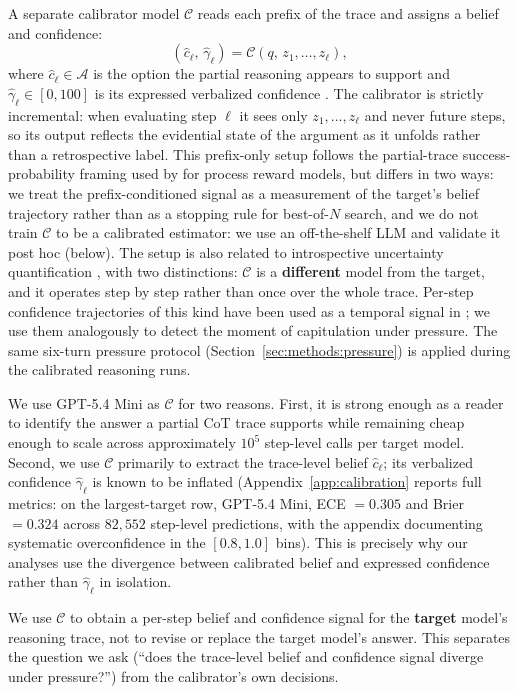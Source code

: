 A separate calibrator model $\mathcal{C}$ reads each prefix of the trace
and assigns a belief and confidence:
\[
(\hat{c}_\ell,\, \hat{\gamma}_\ell) = \mathcal{C}\!\left(q,\, z_1,\ldots, z_\ell\right),
\]
where $\hat{c}_\ell \in \mathcal{A}$ is the option the partial reasoning
appears to support and $\hat{\gamma}_\ell \in [0, 100]$ is its expressed
verbalized confidence \citep{tian2023justask}. The calibrator is
strictly incremental: when evaluating step $\ell$ it sees only
$z_1, \ldots, z_\ell$ and never future steps, so its output reflects the
evidential state of the argument as it unfolds rather than a
retrospective label. This prefix-only setup follows the partial-trace
success-probability framing used by \citet{park2025knowwhatyoudontknow}
for process reward models, but differs in two ways: we treat the prefix-conditioned signal as a measurement of the target's belief trajectory rather than as a stopping rule for best-of-$N$ search, and
we do not train $\mathcal{C}$ to be a calibrated estimator: we use an off-the-shelf LLM and validate it post hoc (below). The setup is also related to introspective uncertainty quantification \citep{mei2025reasoninguncertainty}, with two distinctions: $\mathcal{C}$ is a \textbf{different} model from the target, and it operates step by step rather than once over the whole trace. Per-step confidence trajectories of this kind have been used as a temporal signal in \citet{mao2025temporalizingconfidence}; we use them analogously to detect the moment of capitulation under pressure. The same six-turn pressure protocol (Section~\ref{sec:methods:pressure}) is applied during the calibrated reasoning runs.

We use GPT-5.4 Mini as $\mathcal{C}$ for two reasons. First, it is strong enough as a reader to identify the answer a partial CoT trace supports while remaining cheap enough to scale across approximately $10^5$ step-level calls per target model. Second, we use $\mathcal{C}$ primarily to extract the trace-level belief $\hat{c}_\ell$; its verbalized confidence $\hat{\gamma}_\ell$ is known to be inflated (Appendix~\ref{app:calibration} reports full metrics: on the largest-target row, GPT-5.4 Mini, ECE $= 0.305$ and Brier $= 0.324$ \citep{li2025conftuner} across $82{,}552$ step-level predictions, with the appendix documenting systematic overconfidence in the $[0.8, 1.0]$ bins). This is precisely why our analyses use the divergence between calibrated belief and expressed confidence rather than $\hat{\gamma}_\ell$ in isolation.

We use $\mathcal{C}$ to obtain a per-step belief and confidence signal for the \textbf{target} model's reasoning trace, not to revise or replace the target model's answer. This separates the question we ask (``does the trace-level belief and confidence signal diverge under pressure?'') from the calibrator's own decisions.


